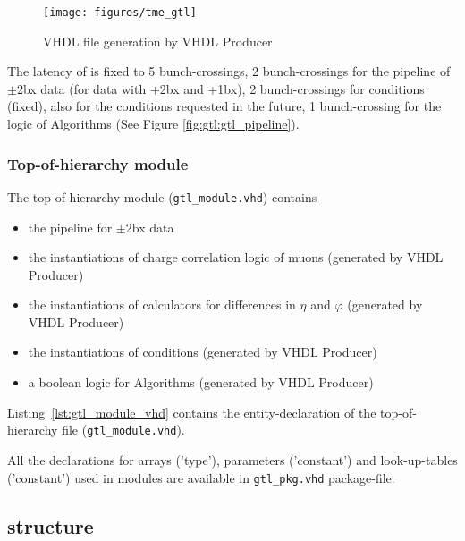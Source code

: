 \begin{figure}[htb]
\centering
\texttt{[image: figures/tme\_gtl]}
\caption{VHDL file generation by VHDL Producer}
\label{fig:gtl:tme_gtl}
\end{figure}

The latency of \ugtl is fixed to 5 bunch-crossings,
2 bunch-crossings for the pipeline of $\pm$2bx data (for data with +2bx and +1bx), 2 bunch-crossings for conditions (fixed), also for the conditions requested in the future, 1 bunch-crossing for the logic of Algorithms (See Figure \ref{fig:gtl:gtl_pipeline}).\\

\subsubsection{Top-of-hierarchy module}
\label{sec:gtl:top_module}

The top-of-hierarchy module (\texttt{gtl\_module.vhd}) contains
\begin {itemize}
\item the pipeline for $\pm$2bx data
\item the instantiations of charge correlation logic of muons (generated by VHDL Producer)
\item the instantiations of calculators for differences in $\eta$ and $\varphi$ (generated by VHDL Producer)
\item the instantiations of conditions (generated by VHDL Producer)
\item a boolean logic for Algorithms (generated by VHDL Producer)
\end {itemize}

Listing~\ref{lst:gtl_module_vhd} contains the entity-declaration of the top-of-hierarchy file (\texttt{gtl\_module.vhd}).



All the declarations for arrays ('type'), parameters ('constant') and look-up-tables ('constant') used in modules are available in \texttt{gtl\_pkg.vhd} package-file.

\clearpage

\subsection{\ugtl structure}
\label{sec:gtl:mgtl_structure}

